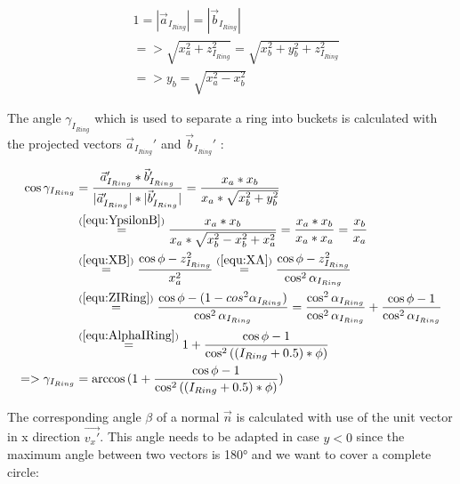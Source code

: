 \documentclass[../ClassicThesis.tex]{subfiles}
\begin{document}
\begin{equation}
\begin{split}
    \label{equ:YpsilonB}
    & 1 = |\vec{a}_{I_{Ring}}| = |\vec{b}_{I_{Ring}}| \\
    & => \sqrt{ x_{a}^{2} + z_{I_{Ring}}^{2} } = \sqrt{ x_{b}^{2} + y_{b}^{2} + z_{I_{Ring}}^{2} } \\
    & => y_{b} = \sqrt{ x_{a}^{2} - x_{b}^{2} }
\end{split}
\end{equation}


The angle ${\gamma}_{I_{Ring}}$ which is used to separate a ring into buckets is calculated with the projected vectors $ \vec{a}_{I_{Ring}}' $ and $ \vec{b}_{I_{Ring}}' $ :

\begin{equation}
\begin{split}
    \cos{{\gamma}_{I_{Ring}}}& = \frac{\vec{a}_{I_{Ring}}' * \vec{b}_{I_{Ring}}'}{|\vec{a}_{I_{Ring}}'| * |\vec{b}_{I_{Ring}}'|}
    = \frac{ x_{a} * x_{b} }{ x_{a} * \sqrt{  x_{b}^{2} +  y_{b}^{2} } } \\
    & \stackrel{(\ref{equ:YpsilonB})}{=} \frac{ x_{a} * x_{b} }{ x_{a} * \sqrt{  x_{b}^{2} - x_{b}^{2} +  x_{a}^{2} } }
    = \frac{ x_{a} * x_{b} }{ x_{a} * x_{a} }
    = \frac{ x_{b} }{ x_{a} } \\
    & \stackrel{(\ref{equ:XB})}{=} \frac{ \cos{\phi} - z_{I_{Ring}}^{2} }{ x_{a}^{2} }
    \stackrel{(\ref{equ:XA})}{=} \frac{ \cos{\phi} - z_{I_{Ring}}^{2} }{ \cos^{2}{{\alpha}_{I_{Ring}}} } \\
    & \stackrel{(\ref{equ:ZIRing})}{=} \frac{ \cos{\phi} - ( 1 - cos^{2}{{\alpha}_{I_{Ring}}} ) }{ \cos^{2}{{\alpha}_{I_{Ring}}} }
    = \frac{ \cos^{2}{{\alpha}_{I_{Ring}}} }{ \cos^{2}{{\alpha}_{I_{Ring}}} } + \frac{ \cos{\phi} - 1 }{ \cos^{2}{{\alpha}_{I_{Ring}}} } \\
    & \stackrel{(\ref{equ:AlphaIRing})}{=} 1 + \frac{ \cos{\phi} - 1 }{ \cos^{2}{( (I_{Ring} + 0.5) * \phi )} } \\
    => {\gamma}_{I_{Ring}} & = \arccos{( 1 + \frac{ \cos{\phi} - 1 }{ \cos^{2}{( (I_{Ring} + 0.5) * \phi )} } )}
\end{split}
\end{equation}


The corresponding angle $ \beta $ of a normal $ \vec{n} $ is calculated with use of the unit vector in x direction $ \vec{v_{x}'} $. This angle needs to be adapted in case $ y < 0 $ since the maximum angle between two vectors is 180° and we want to cover a complete circle:
\end{document}
